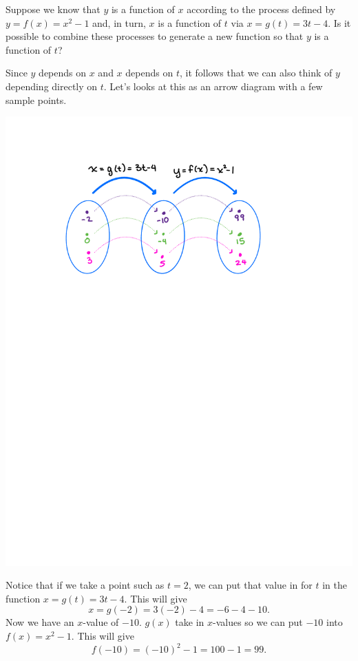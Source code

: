 \documentclass{ximera}
\begin{document}
\begin{example}
Suppose we know that $y$ is a function of $x$ according to the process defined by $y = f(x) = x^2 - 1$ and, in turn, $x$ is a function of $t$ via $x = g(t) = 3t-4$.  Is it possible to combine these processes to generate a new function so that $y$ is a function of $t$?

\begin{explanation}
Since $y$ depends on $x$ and $x$ depends on $t$, it follows that we can also think of $y$ depending directly on $t$.  Let's looks at this as an arrow diagram with a few sample points.

\begin{image}
\includegraphics{CompositionText.pdf}
\end{image}

Notice that if we take a point such as $t=2$, we can put that value in for $t$ in the function $x = g(t) = 3t-4$.  This will give $$x = g(-2) = 3(-2)-4=-6-4-10.$$
Now we have an $x$-value of $-10$.  $g(x)$ take in $x$-values so we can put $-10$ into $f(x)=x^2-1$.  This will give $$f(-10)=(-10)^2-1=100-1=99.$$


\end{explanation}
\end{example}
\end{document}
